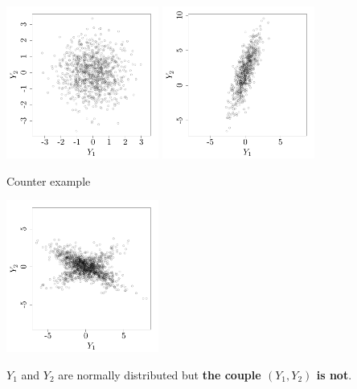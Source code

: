 \documentclass{beamer}
\begin{document}
\begin{frame}{}
\begin{example}
\begin{center}
 \includegraphics[height=5cm]{figures/R/MVN_gaussvec2} \quad \includegraphics[height=5cm]{figures/R/MVN_gaussvec1} 
\end{center}
\end{example}
\end{frame}

\begin{frame}{}
\begin{exampleblock}{Counter example}
\begin{center}
 \includegraphics[height=5cm]{figures/R/MVN_gaussvec3}
\end{center}
$Y_1$ and $Y_2$ are normally distributed but \textbf{the couple $(Y_1,Y_2)$ is not}.
\end{exampleblock}
\end{frame}
\end{document}
